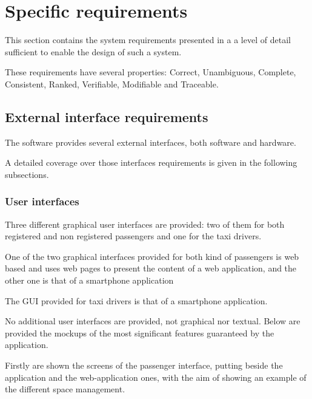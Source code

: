 \section{Specific requirements}
This section contains the system requirements presented in a a level of detail sufficient to enable the design of such a system.\par
These requirements have several properties: Correct, Unambiguous, Complete, Consistent, Ranked, Verifiable, Modifiable and Traceable.
\subsection{External interface requirements}
The software \myTaxiService{} provides several external interfaces, both software and hardware.\par
A detailed coverage over those interfaces requirements is given in the following subsections.
\subsubsection{User interfaces}
Three different graphical user interfaces are provided: two of them for both registered and non registered passengers and one for the taxi drivers.\par
One of the two graphical interfaces provided for both kind of passengers is web based and uses web pages to present the content of a web application, and the other one is that of a smartphone application\par
The GUI provided for taxi drivers is that of a smartphone application.\par
No additional user interfaces are provided, not graphical nor textual.
Below are provided the mockups of the  most significant features guaranteed by the application.\par
Firstly are shown the screens of the passenger interface, putting beside the application and the web-application ones, with the aim of showing an example of the different space management. \par 
\newpage

